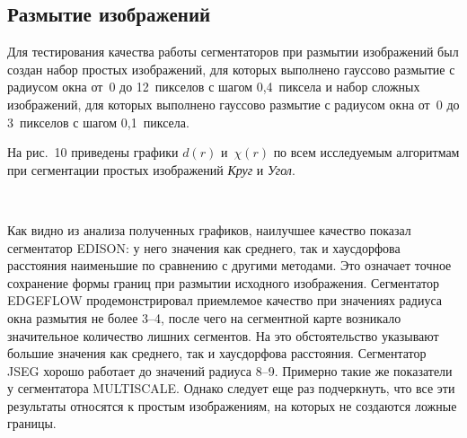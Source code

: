 \begin{multicols}{2}
\vspace*{-6pt}
  
  \subsection{Размытие изображений}
  
  \vspace*{-2pt}
  
  Для тестирования качества работы сегментаторов при размытии 
изображений был создан набор простых изображений, для которых выполнено 
гауссово размытие с радиусом окна от~0 до 12~пикселов с шагом 0,4~пиксела и 
набор сложных изображений, для которых выполнено гауссово размытие с 
радиусом окна от~0 до 3~пикселов с шагом 0,1~пиксела.
  
  На рис.~10 приведены графики $d(r)$ и~$\chi(r)$ по всем 
исследуемым алгоритмам при сегментации простых изображений \textit{Круг} 
и \textit{Угол}.

  \begin{figure*} %
  \vspace*{1pt}
\begin{center}
\mbox{%
\epsfxsize=161.93mm
}
\end{center}
\vspace*{-12pt}
    \vspace*{-6pt}
  \end{figure*}

  Как видно из анализа полученных графиков, наилучшее качество показал 
сегментатор {EDISON}: у него значения как среднего, так и хаусдорфова 
расстояния наименьшие по сравнению с другими методами. Это означает 
точное сохранение формы границ при размытии исходного изображения. 
Сегментатор {EDGEFLOW} продемонстрировал приемлемое качество при 
значениях радиуса окна размытия не более 3--4, после чего на сегментной карте 
возникало значительное количество лишних сегментов. На это обстоятельство 
указывают большие значения как среднего, так и хаусдорфова расстояния. 
Сегментатор {JSEG} хорошо работает до значений радиуса 8--9. 
Примерно такие же показатели у сегментатора {MULTISCALE}. Однако 
следует еще раз подчеркнуть, что все эти результаты относятся к простым 
изображениям, на которых не создаются ложные границы.
  

\end{multicols}
